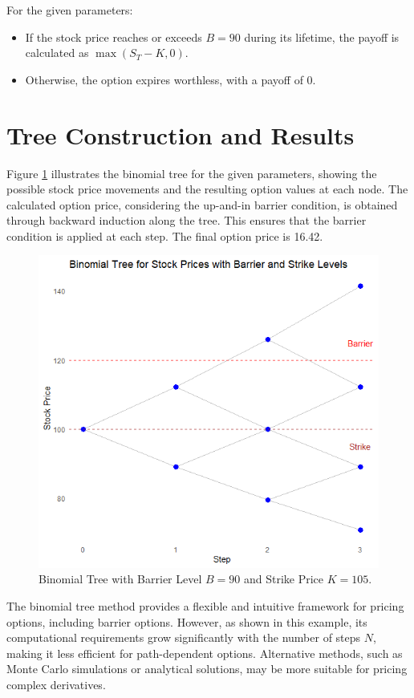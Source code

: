 For the given parameters:
\begin{itemize}
    \item If the stock price reaches or exceeds \(B = 90\) during its lifetime, the payoff is calculated as \(\max(S_T - K, 0)\).
    \item Otherwise, the option expires worthless, with a payoff of 0.
\end{itemize}

\section{Tree Construction and Results}

Figure \ref{fig:binomial-tree} illustrates the binomial tree for the given parameters, showing the possible stock price movements and the resulting option values at each node. The calculated option price, considering the up-and-in barrier condition, is obtained through backward induction along the tree. This ensures that the barrier condition is applied at each step. The final option price is 16.42.


\begin{figure}[h]
    \centering
    \includegraphics[width=.75\linewidth]{content/images/three-step.png}
    \caption{Binomial Tree with Barrier Level \(B = 90\) and Strike Price \(K = 105\).}
    \label{fig:binomial-tree}
\end{figure}

The binomial tree method provides a flexible and intuitive framework for pricing options, including barrier options. However, as shown in this example, its computational requirements grow significantly with the number of steps \(N\), making it less efficient for path-dependent options. Alternative methods, such as Monte Carlo simulations or analytical solutions, may be more suitable for pricing complex derivatives.
